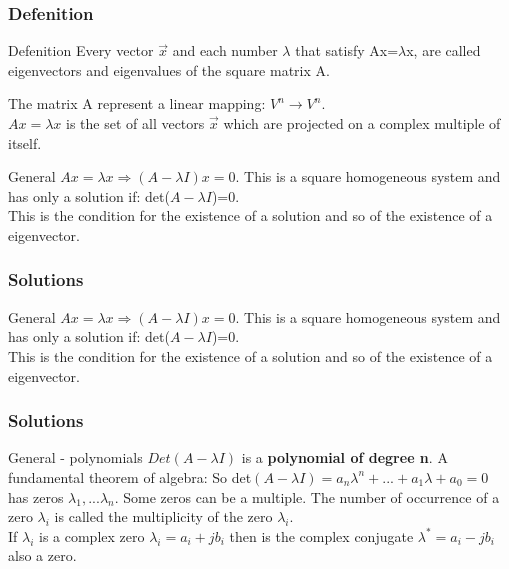 \begin{frame}
	\frametitle{Defenition}
	\begin{block}{Defenition}
		Every vector $\overrightarrow{x}$ and each number $\lambda$ that satisfy  Ax=$\lambda$x, are called eigenvectors and eigenvalues of the square matrix A.\vspace{4mm}
		
		The matrix A represent a linear mapping: $V^n \rightarrow V^n$.\\
		$Ax=\lambda x$ is the set of all vectors $\overrightarrow{x}$ which are projected on a complex multiple of itself.
	\end{block}
	\begin{block}{General}
		$Ax=\lambda x \Rightarrow (A-\lambda I)x=0$. This is a square homogeneous system and has only a solution if: det($A-\lambda I$)=0.\\
		This is the condition for the existence of a solution and so of the existence of a eigenvector.
	\end{block}
\end{frame}

\begin{frame}
	\frametitle{Solutions}
	\begin{block}{General}
		$Ax=\lambda x \Rightarrow (A-\lambda I)x=0$. This is a square homogeneous system and has only a solution if: det($A-\lambda I$)=0.\\
		This is the condition for the existence of a solution and so of the existence of a eigenvector.
	\end{block}
\end{frame}

\begin{frame}
	\frametitle{Solutions}
	\begin{block}{General - polynomials}
		$Det(A-\lambda I)$ is a \textbf{polynomial of degree n}. A fundamental theorem of algebra: 
		\vspace{4mm}
		So det$(A-\lambda I)=a_n\lambda^n +...+a_1\lambda+a_0=0$ has zeros $\lambda_1,...\lambda_n$. Some zeros can be a multiple. The number of occurrence of a zero $\lambda_i$ is called the multiplicity of the zero $\lambda_i$.\\
		If $\lambda_i$ is a complex zero $\lambda_i=a_i+jb_i$ then is the complex conjugate $\lambda^*=a_i-jb_i$ also a zero.
	\end{block}
\end{frame}

